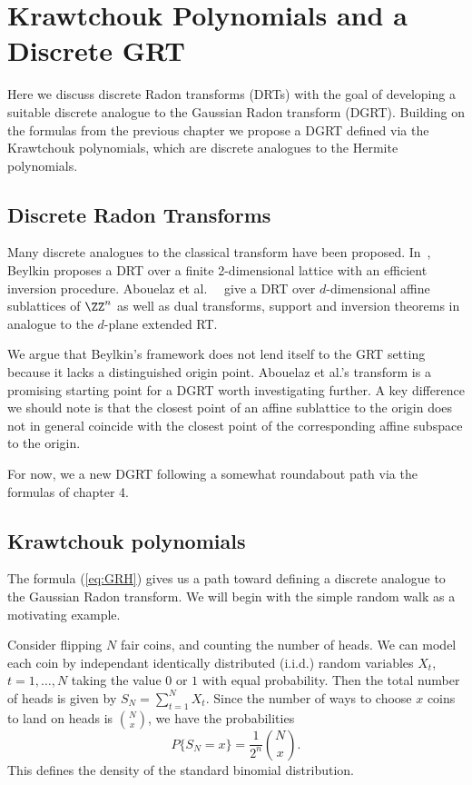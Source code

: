 \chapter{Krawtchouk Polynomials and a Discrete GRT}{}
\label{chap:DGRT}

Here we discuss discrete Radon transforms (DRTs) with the goal of developing a suitable discrete analogue to the Gaussian Radon transform (DGRT). Building on the formulas from the previous chapter we propose a DGRT defined via the Krawtchouk polynomials, which are discrete analogues to the Hermite polynomials.

\section{Discrete Radon Transforms}

Many discrete analogues to the classical transform have been proposed. In~\cite{Beyl87}, Beylkin proposes a DRT over a finite 2-dimensional lattice with an efficient inversion procedure. Abouelaz et al.~\cite{Abou08}~\cite{Abou09} give a DRT over $d$-dimensional affine sublattices of $\ZZ^n$ as well as dual transforms, support and inversion theorems in analogue to the $d$-plane extended RT. 

We argue that Beylkin's framework does not lend itself to the GRT setting because it lacks a distinguished origin point. Abouelaz et al.'s transform is a promising starting point for a DGRT worth investigating further. A key difference we should note is that the closest point of an affine sublattice to the origin does not in general coincide with the closest point of the corresponding affine subspace to the origin.

For now, we a new DGRT following a somewhat roundabout path via the formulas of chapter 4.

\section{Krawtchouk polynomials}

The formula (\ref{eq:GRH}) gives us a path toward defining a discrete analogue to the Gaussian Radon transform. 
We will begin with the simple random walk as a motivating example. 

Consider flipping $N$ fair coins, and counting the number of heads. We can model each coin by independant identically distributed (i.i.d.) random variables $X_t$, $t = 1, \ldots, N$ taking the value $0$ or $1$ with equal probability. Then the total number of heads is given by
$
  S_N = \sum_{t = 1}^{N} X_t.
$
Since the number of ways to choose $x$ coins to land on heads is $\binom{N}{x}$, we have the probabilities
\[
  P\{S_N = x\} = \frac1{2^n}\binom{N}{x}.
\]
This defines the density of the standard binomial distribution.

